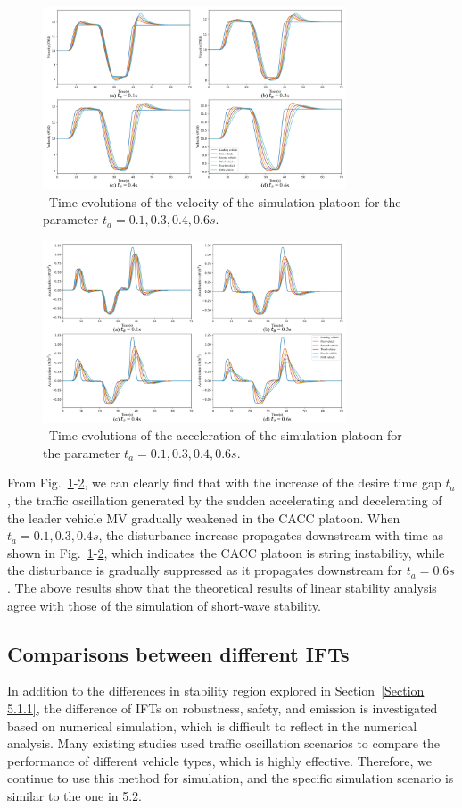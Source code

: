 \documentclass[journal]{IEEEtran}
\begin{document}
\begin{figure}
\includegraphics[width=9cm]{fig5.png}
\caption{~Time evolutions of the velocity of the simulation platoon for the parameter $t_a=0.1,0.3,0.4,0.6s$.} 
\label{Figure5}
\end{figure}

\begin{figure}
\includegraphics[width=9cm]{fig6.png}
\caption{~Time evolutions of the acceleration of the simulation platoon for the parameter $t_a=0.1,0.3,0.4,0.6s$.} 
\label{Figure6}
\end{figure}

From Fig.~\ref{Figure5}-\ref{Figure6}, we can clearly find that with the increase of the desire time gap $t_a$, the traffic oscillation generated by the sudden accelerating and decelerating of the leader vehicle MV gradually weakened in the CACC platoon. When $t_a=0.1,0.3,0.4s$, the disturbance increase propagates downstream with time as shown in Fig.~\ref{Figure5}-\ref{Figure6}, which indicates the CACC platoon is string instability, while the disturbance is gradually suppressed as it propagates downstream for $t_a=0.6s$. The above results show that the theoretical results of linear stability analysis agree with those of the simulation of short-wave stability.

\subsection{Comparisons between different IFTs}
In addition to the differences in stability region explored in Section~\ref{Section 5.1.1}, the difference of IFTs on robustness, safety, and emission is investigated based on numerical simulation, which is difficult to reflect in the numerical analysis. Many existing studies\citep{gong2016constrained}\citep{li2014stop} used traffic oscillation scenarios to compare the performance of different vehicle types, which is highly effective. Therefore, we continue to use this method for simulation, and the specific simulation scenario is similar to the one in 5.2.
\end{document}
